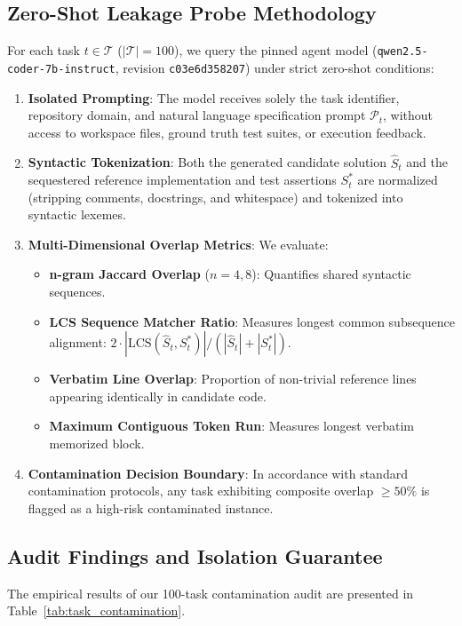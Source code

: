 \documentclass{article}
\begin{document}
\subsection{Zero-Shot Leakage Probe Methodology}
For each task $t \in \mathcal{T}$ ($|\mathcal{T}| = 100$), we query the pinned agent model (\texttt{qwen2.5-coder-7b-instruct}, revision \texttt{c03e6d358207}) under strict zero-shot conditions:
\begin{enumerate}
    \item \textbf{Isolated Prompting}: The model receives solely the task identifier, repository domain, and natural language specification prompt $\mathcal{P}_t$, without access to workspace files, ground truth test suites, or execution feedback.
    \item \textbf{Syntactic Tokenization}: Both the generated candidate solution $\hat{S}_t$ and the sequestered reference implementation and test assertions $S^*_t$ are normalized (stripping comments, docstrings, and whitespace) and tokenized into syntactic lexemes.
    \item \textbf{Multi-Dimensional Overlap Metrics}: We evaluate:
    \begin{itemize}
        \item \textbf{n-gram Jaccard Overlap} ($n=4, 8$): Quantifies shared syntactic sequences.
        \item \textbf{LCS Sequence Matcher Ratio}: Measures longest common subsequence alignment: $2 \cdot |\text{LCS}(\hat{S}_t, S^*_t)| / (|\hat{S}_t| + |S^*_t|)$.
        \item \textbf{Verbatim Line Overlap}: Proportion of non-trivial reference lines appearing identically in candidate code.
        \item \textbf{Maximum Contiguous Token Run}: Measures longest verbatim memorized block.
    \end{itemize}
    \item \textbf{Contamination Decision Boundary}: In accordance with standard contamination protocols, any task exhibiting composite overlap $\ge 50\%$ is flagged as a high-risk contaminated instance.
\end{enumerate}

\subsection{Audit Findings and Isolation Guarantee}
The empirical results of our 100-task contamination audit are presented in Table~\ref{tab:task_contamination}.
\end{document}
